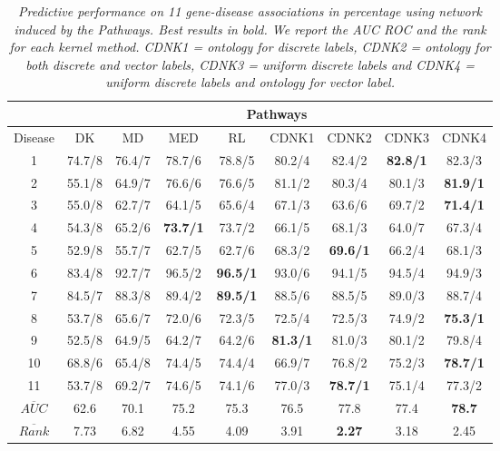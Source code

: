 \documentclass[review]{elsarticle}
\begin{document}
\begin{table}[h]
\caption{\textit {Predictive performance on 11 gene-disease associations in percentage using network induced by the Pathways. Best results in bold. We report the AUC ROC and the rank for each kernel method.  CDNK1 = ontology for discrete labels, CDNK2 = ontology for both discrete and vector labels, CDNK3 = uniform discrete labels and CDNK4 = uniform discrete labels and ontology for vector label.}} \vspace{1em}
\centering
\setlength{\tabcolsep}{1mm}
\begin{tabular}{|c|c|c|c|c|c|c|c|c|}
\hline
         & \multicolumn{8}{c|}{\textbf{Pathways}} \\
 \hline
Disease & DK & MD & MED & RL & CDNK1 & CDNK2 & CDNK3 & CDNK4 \\

 \hline
1 & 74.7/8 & 76.4/7 & 78.7/6 & 78.8/5 & 80.2/4 & 82.4/2 & \textbf{82.8/1} & 82.3/3 \\

2 & 55.1/8 & 64.9/7 & 76.6/6 & 76.6/5 & 81.1/2 & 80.3/4 & 80.1/3 & \textbf{81.9/1} \\

3 & 55.0/8 & 62.7/7 & 64.1/5 & 65.6/4 & 67.1/3 & 63.6/6 & 69.7/2 & \textbf{71.4/1} \\

4 & 54.3/8 & 65.2/6 & \textbf{73.7/1} & 73.7/2 & 66.1/5 & 68.1/3 & 64.0/7 & 67.3/4 \\

5 & 52.9/8 & 55.7/7 & 62.7/5 & 62.7/6 & 68.3/2 & \textbf{69.6/1} & 66.2/4 & 68.1/3 \\

6 & 83.4/8 & 92.7/7 & 96.5/2 & \textbf{96.5/1} & 93.0/6 & 94.1/5 & 94.5/4 & 94.9/3 \\

7 & 84.5/7 & 88.3/8 & 89.4/2 & \textbf{89.5/1} & 88.5/6 & 88.5/5 & 89.0/3 & 88.7/4 \\

8 & 53.7/8 & 65.6/7 & 72.0/6 & 72.3/5 & 72.5/4 & 72.5/3 & 74.9/2 & \textbf{75.3/1} \\

9 & 52.5/8 & 64.9/5 & 64.2/7 & 64.2/6 & \textbf{81.3/1} & 81.0/3 & 80.1/2 & 79.8/4 \\

10 & 68.8/6 & 65.4/8 & 74.4/5 & 74.4/4 & 66.9/7 & 76.8/2 & 75.2/3 & \textbf{78.7/1} \\

11 & 53.7/8 & 69.2/7 & 74.6/5 & 74.1/6 & 77.0/3 & \textbf{78.7/1} & 75.1/4 & 77.3/2 \\

\hline
$\overline{AUC}$ & 62.6	& 70.1 & 75.2 & 75.3 & 76.5 & 77.8 & 77.4 &	\textbf{78.7}
 \\
$\overline{Rank}$ & 7.73 & 6.82 & 4.55 & 4.09 & 3.91 & \textbf{2.27} & 3.18 & 2.45 \\
 \hline 
\end{tabular}
\label{fig:cdnk-pathways}
\end{table}
\end{document}

